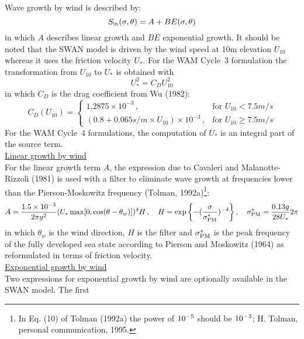 \documentclass[12pt]{book}
\begin{document}
Wave growth by wind is described by:
\begin{equation}
  S_{\rm in} (\sigma, \theta) = A + B E(\sigma,\theta)
  \label{eq3-1}
\end{equation}
in which $A$ describes linear growth and $BE$ exponential growth. It should be noted that the SWAN model
is driven by the wind speed at 10m elevation $U _{10}$ whereas it uses the friction velocity
$U _{*}$. For the WAM Cycle~3 formulation the transformation from $U _{10}$ to $U _{*}$ is obtained with
\begin{equation}
  U^2_* = C_D U^2_{10}
  \label{eq3-2}
\end{equation}
in which $C_D$ is the drag coefficient from Wu (1982):
\begin{equation}
  C_D(U_{10}) =
    \left\{
      \begin{array}{ll}
         1.2875 \times 10^{-3} \, , & \mbox{for } U_{10} < 7.5 m/s\\
         (0.8 + 0.065 s/m \times U_{10}) \times 10^{-3} \, , & \mbox{for }  U_{10} \geq 7.5 m/s
      \end{array}
    \right.
  \label{eq3-3}
\end{equation}
For the WAM Cycle~4 formulations, the computation of $U _{*}$ is an integral part of the source term.
\\[2ex]
\noindent
\underline{Linear growth by wind}\\[2ex]
For the linear growth term $A$, the expression due to Cavaleri and Malanotte-Rizzoli (1981) is used with a
filter to eliminate wave growth at frequencies lower than the Pierson-Moskowitz frequency (Tolman,
1992a)\footnote{In Eq. (10) of Tolman (1992a) the power of $10^{\rm -5}$ should be $10^{\rm -3}$; H. Tolman, personal
communication, 1995.}:
\begin{equation}
  A = \frac{1.5 \times 10^{-3}}{2 \pi g^2} (U_* \max [0,\cos(\theta-\theta_w)])^4 H\, , \quad
  H = \exp{ \left \{ -(\frac{\sigma}{\sigma^{*}_{\rm PM}})^{-4} \right\} }\, , \quad
  \sigma_{\rm PM}^{*} = \frac{0.13 g}{28 U_*} 2 \pi
  \label{eq3-4}
\end{equation}
in which $\theta_w$ is the wind direction, $H$ is the filter and $\sigma^{*}_{\rm PM}$ is the peak frequency of the
fully developed sea state according to Pierson and Moskowitz (1964) as reformulated in terms of friction velocity.
\\[2ex]
\noindent
\underline{Exponential growth by wind}\\[2ex]
Two expressions for exponential growth by wind are optionally available in the SWAN model. The first
\end{document}

